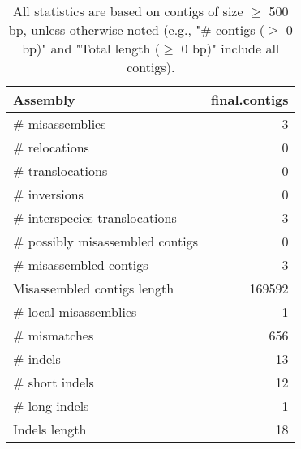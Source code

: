 \documentclass[12pt,a4paper]{article}
\begin{document}
\begin{table}[ht]
\begin{center}
\caption{All statistics are based on contigs of size $\geq$ 500 bp, unless otherwise noted (e.g., "\# contigs ($\geq$ 0 bp)" and "Total length ($\geq$ 0 bp)" include all contigs).}
\begin{tabular}{|l*{1}{|r}|}
\hline
Assembly & final.contigs \\ \hline
\# misassemblies & 3 \\ \hline
\hspace{5mm}\# relocations & 0 \\ \hline
\hspace{5mm}\# translocations & 0 \\ \hline
\hspace{5mm}\# inversions & 0 \\ \hline
\hspace{5mm}\# interspecies translocations & 3 \\ \hline
\# possibly misassembled contigs & 0 \\ \hline
\# misassembled contigs & 3 \\ \hline
Misassembled contigs length & 169592 \\ \hline
\# local misassemblies & 1 \\ \hline
\# mismatches & 656 \\ \hline
\# indels & 13 \\ \hline
\hspace{5mm}\# short indels & 12 \\ \hline
\hspace{5mm}\# long indels & 1 \\ \hline
Indels length & 18 \\ \hline
\end{tabular}
\end{center}
\end{table}
\end{document}
